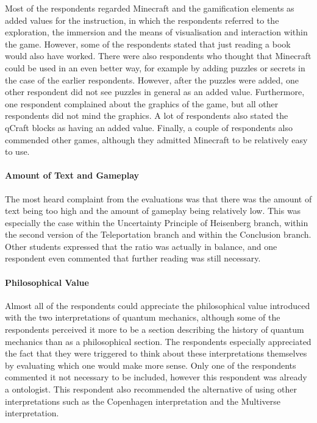\documentclass[11pt,twoside]{report} %
\begin{document}
Most of the respondents regarded Minecraft and the gamification elements as added values for the instruction, in which the respondents referred to the exploration, the immersion and the means of visualisation and interaction within the game. However, some of the respondents stated that just reading a book would also have worked. There were also respondents who thought that Minecraft could be used in an even better way, for example by adding puzzles or secrets in the case of the earlier respondents. However, after the puzzles were added, one other respondent did not see puzzles in general as an added value. Furthermore, one respondent complained about the graphics of the game, but all other respondents did not mind the graphics. A lot of respondents also stated the qCraft blocks as having an added value. Finally, a couple of respondents also commended other games, although they admitted Minecraft to be relatively easy to use.

\paragraph{Amount of Text and Gameplay}

The most heard complaint from the evaluations was that there was the amount of text being too high and the amount of gameplay being relatively low. This was especially the case within the Uncertainty Principle of Heisenberg branch, within the second version of the Teleportation branch and within the Conclusion branch. Other students expressed that the ratio was actually in balance, and one respondent even commented that further reading was still necessary.

\paragraph{Philosophical Value}

Almost all of the respondents could appreciate the philosophical value introduced with the two interpretations of quantum mechanics, although some of the respondents perceived it more to be a section describing the history of quantum mechanics than as a philosophical section. The respondents especially appreciated the fact that they were triggered to think about these interpretations themselves by evaluating which one would make more sense. Only one of the respondents commented it not necessary to be included, however this respondent was already a ontologist. This respondent also recommended the alternative of using other interpretations such as the Copenhagen interpretation and the Multiverse interpretation.
\end{document}
